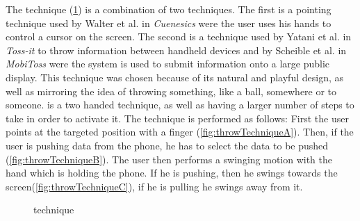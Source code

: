 The \throw technique (\cref{fig:throwTechnique}) is a combination of two techniques.
The first is a pointing technique used by Walter et al. in \emph{Cuenesics} \cite{Walter:2014} were the user uses his hands to control a cursor on the screen.
The second is a technique used by Yatani et al. \cite{Yatani:2005} in \emph{Toss-it} to throw information between handheld devices and by Scheible et al. in \emph{MobiToss} \cite{Scheible:2008} were the system is used to submit information onto a large public display.
This technique was chosen because of its natural and playful design, as well as mirroring the idea of throwing something, like a ball, somewhere or to someone.
\throw is a two handed technique, as well as having a larger number of steps to take in order to activate it.
The \throw technique is performed as follows: 
First the user points at the targeted position with a finger (\cref{fig:throwTechniqueA}).
Then, if the user is pushing data from the phone, he has to select the data to be pushed (\cref{fig:throwTechniqueB}).
The user then performs a swinging motion with the hand which is holding the phone.
If he is pushing, then he swings towards the screen(\cref{fig:throwTechniqueC}), if he is pulling he swings away from it. 


\begin{figure}[H]
	\caption{\push \throw technique}
	\label{fig:throwTechnique}
\end{figure}

